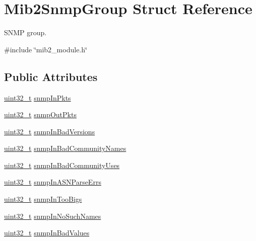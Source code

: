 \hypertarget{structMib2SnmpGroup}{}\section{Mib2\+Snmp\+Group Struct Reference}
\label{structMib2SnmpGroup}


S\+N\+MP group.  




{\ttfamily \#include \char`\"{}mib2\+\_\+module.\+h\char`\"{}}

\subsection*{Public Attributes}
\begin{DoxyCompactItemize}
\item 
\hyperlink{stdint_8h_a435d1572bf3f880d55459d9805097f62}{uint32\+\_\+t} \hyperlink{structMib2SnmpGroup_a26570c171babeb840b0a6c550f8ac96a}{snmp\+In\+Pkts}
\item 
\hyperlink{stdint_8h_a435d1572bf3f880d55459d9805097f62}{uint32\+\_\+t} \hyperlink{structMib2SnmpGroup_a554433e74a793832332c1d7aa54f686a}{snmp\+Out\+Pkts}
\item 
\hyperlink{stdint_8h_a435d1572bf3f880d55459d9805097f62}{uint32\+\_\+t} \hyperlink{structMib2SnmpGroup_a1ded3012157dea4ac4e7b4276526ce1c}{snmp\+In\+Bad\+Versions}
\item 
\hyperlink{stdint_8h_a435d1572bf3f880d55459d9805097f62}{uint32\+\_\+t} \hyperlink{structMib2SnmpGroup_ab03c9b801ed395725f30621a17a2d292}{snmp\+In\+Bad\+Community\+Names}
\item 
\hyperlink{stdint_8h_a435d1572bf3f880d55459d9805097f62}{uint32\+\_\+t} \hyperlink{structMib2SnmpGroup_a89810d4d577c7d0b61693c48fbfbde23}{snmp\+In\+Bad\+Community\+Uses}
\item 
\hyperlink{stdint_8h_a435d1572bf3f880d55459d9805097f62}{uint32\+\_\+t} \hyperlink{structMib2SnmpGroup_aa1e5e8cf3296ae204d1390d3fb5a8ead}{snmp\+In\+A\+S\+N\+Parse\+Errs}
\item 
\hyperlink{stdint_8h_a435d1572bf3f880d55459d9805097f62}{uint32\+\_\+t} \hyperlink{structMib2SnmpGroup_a7018f96f34d114954983cb041283957c}{snmp\+In\+Too\+Bigs}
\item 
\hyperlink{stdint_8h_a435d1572bf3f880d55459d9805097f62}{uint32\+\_\+t} \hyperlink{structMib2SnmpGroup_afae20bdf06be1f37b0899fec2b8fd764}{snmp\+In\+No\+Such\+Names}
\item 
\hyperlink{stdint_8h_a435d1572bf3f880d55459d9805097f62}{uint32\+\_\+t} \hyperlink{structMib2SnmpGroup_a488fe92698038302711b97ce3d0c156a}{snmp\+In\+Bad\+Values}

\end{DoxyCompactItemize}
